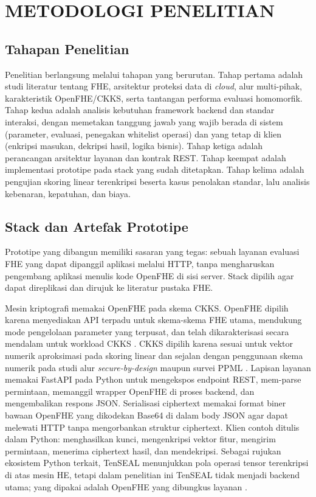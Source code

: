 \documentclass[12pt,a4paper,oneside]{report}
\begin{document}
\chapter{METODOLOGI PENELITIAN}

\section{Tahapan Penelitian}

Penelitian berlangsung melalui tahapan yang berurutan. Tahap pertama adalah studi literatur tentang FHE, arsitektur proteksi data di \emph{cloud}, alur multi-pihak, karakteristik OpenFHE/CKKS, serta tantangan performa evaluasi homomorfik. Tahap kedua adalah analisis kebutuhan framework backend dan standar interaksi, dengan memetakan tanggung jawab yang wajib berada di sistem (parameter, evaluasi, penegakan whitelist operasi) dan yang tetap di klien (enkripsi masukan, dekripsi hasil, logika bisnis). Tahap ketiga adalah perancangan arsitektur layanan dan kontrak REST. Tahap keempat adalah implementasi prototipe pada stack yang sudah ditetapkan. Tahap kelima adalah pengujian skoring linear terenkripsi beserta kasus penolakan standar, lalu analisis kebenaran, kepatuhan, dan biaya.

\section{Stack dan Artefak Prototipe}

Prototipe yang dibangun memiliki sasaran yang tegas: sebuah layanan evaluasi FHE yang dapat dipanggil aplikasi melalui HTTP, tanpa mengharuskan pengembang aplikasi menulis kode OpenFHE di sisi server. Stack dipilih agar dapat direplikasi dan dirujuk ke literatur pustaka FHE.

Mesin kriptografi memakai OpenFHE pada skema CKKS. OpenFHE dipilih karena menyediakan API terpadu untuk skema-skema FHE utama, mendukung mode pengelolaan parameter yang terpusat, dan telah dikarakterisasi secara mendalam untuk workload CKKS \cite{badawi2022openfhe,brynds2025cryptoracle}. CKKS dipilih karena sesuai untuk vektor numerik aproksimasi pada skoring linear dan sejalan dengan penggunaan skema numerik pada studi alur \emph{secure-by-design} maupun survei PPML \cite{vinko2026secureByDesign,wu2025ckksSurvey}. Lapisan layanan memakai FastAPI pada Python untuk mengekspos endpoint REST, mem-parse permintaan, memanggil wrapper OpenFHE di proses backend, dan mengembalikan respons JSON. Serialisasi ciphertext memakai format biner bawaan OpenFHE yang dikodekan Base64 di dalam body JSON agar dapat melewati HTTP tanpa mengorbankan struktur ciphertext. Klien contoh ditulis dalam Python: menghasilkan kunci, mengenkripsi vektor fitur, mengirim permintaan, menerima ciphertext hasil, dan mendekripsi. Sebagai rujukan ekosistem Python terkait, TenSEAL menunjukkan pola operasi tensor terenkripsi di atas mesin HE, tetapi dalam penelitian ini TenSEAL tidak menjadi backend utama; yang dipakai adalah OpenFHE yang dibungkus layanan \cite{benaissa2021tenseal}.
\end{document}
